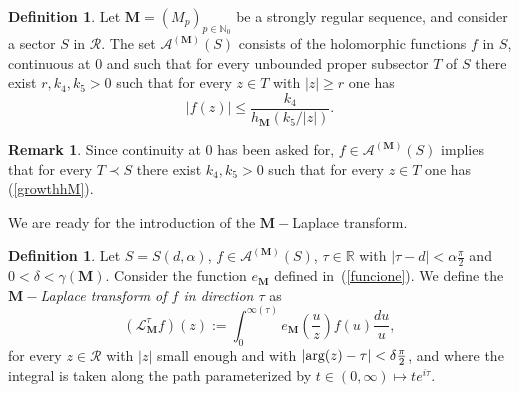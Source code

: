 \documentclass[11pt,a4paper,leqno]{article}
\theoremstyle{plain}
\theoremstyle{definition}
\newtheorem{defin}[theo]{Definition}
\newtheorem{rem}[theo]{Remark}
\def\N{\mathbb{N}}
\def\R{\mathbb{R}}
\def\bM{\boldsymbol{M}}
\begin{document}
\begin{defin}
Let $\bM=(M_{p})_{p\in\N_0}$ be a strongly regular sequence, and consider a sector $S$ in $\mathcal{R}$.
The set $\mathcal{A}^{(\bM)}(S)$ consists of the holomorphic functions $f$ in $S$, continuous at 0 and such that for every unbounded proper subsector $T$ of $S$ there exist $r,k_4,k_5>0$ such that for every $z\in T$ with $|z|\ge r$ one has
\begin{equation}\label{growthhM}
|f(z)|\le\frac{k_4}{h_{\bM}(k_5/|z|)}.
\end{equation}
\end{defin}
\begin{rem}
Since continuity at 0 has been asked for, $f\in\mathcal{A}^{(\bM)}(S)$ implies that for every $T\prec S$ there exist $k_4,k_5>0$ such that for every $z\in T$ one has (\ref{growthhM}).
\end{rem}
\noindent We are ready for the introduction of the $\bM-$Laplace transform.
\begin{defin}
Let $S=S(d,\alpha)$, $f\in\mathcal{A}^{(\bM)}(S)$, $\tau\in\R$ with $|\tau-d|<\alpha\frac{\pi}{2}$ and $0<\delta<\gamma(\bM)$. Consider the function $e_{\bM}$ defined in~(\ref{funcione}). We define the \textit{$\bM-$Laplace transform of $f$ in direction $\tau$} as
$$\left(\mathcal{L}_{\bM}^{\tau}f\right)(z):= \int_{0}^{\infty(\tau)}e_{\bM}\left(\frac{u}{z}\right)f(u)\frac{du}{u},$$
for every $z\in\mathcal{R}$ with $|z|$ small enough and with $|\hbox{arg}(z)-\tau|<\delta\frac{\pi}{2}$, and where the integral is taken along the path parameterized by $t\in(0,\infty)\mapsto te^{i\tau}$.
\end{defin}
\end{document}
